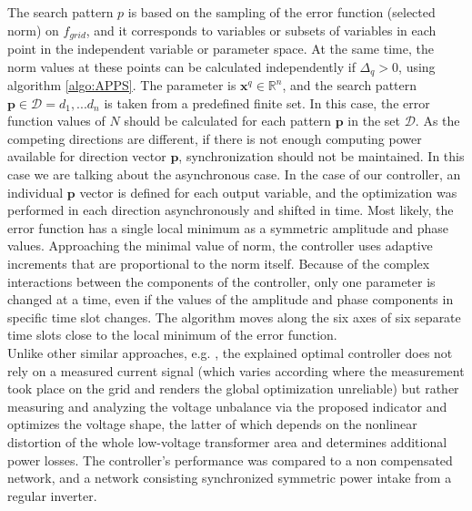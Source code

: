          The search pattern $p$ is based on the sampling of the error function (selected norm) on $f_{grid}$, and it corresponds to variables or subsets of variables in each point in the independent variable or parameter space. At the same time, the norm values at these points can be calculated independently if $\Delta_q>0$, using algorithm \ref{algo:APPS}.	
        The parameter is $\textbf{x}^q\in\mathbb{R}^n$, and the  search pattern $\textbf{p}\in\mathcal{D}={d_1,...d_n}$ is taken from a predefined finite set. In this case, the error function values of $N$ should be calculated for each pattern $\textbf{p}$ in the set $\mathcal{D}$. As the competing directions are different, if there is not enough computing power available for direction vector $\textbf{p}$, synchronization should not be maintained. In this case we are talking about the asynchronous case. In the case of our controller, an individual $\textbf{p}$ vector is defined for each output variable, and the optimization was performed in each direction asynchronously and shifted in time. Most likely, the error function has a single local minimum as a symmetric amplitude and phase values. Approaching the minimal value of norm, the controller uses adaptive increments that are proportional to the norm itself. Because of the complex interactions between the components of the controller, only one parameter is changed at a time, even if the values of the amplitude and phase components in specific time slot changes. The algorithm moves along the six axes of six separate time slots close to the local minimum of the error function.\\
        Unlike other similar approaches, e.g. \cite{segui2007approach}, the explained optimal controller does not rely on a measured current signal (which varies according where the measurement took place on the grid and renders the global optimization unreliable) but rather measuring and analyzing the voltage unbalance via the proposed indicator and optimizes the voltage shape, the latter of which depends on the nonlinear distortion of the whole low-voltage transformer area and determines additional power losses. The controller's performance was compared to a non compensated network, and a network consisting synchronized symmetric power intake from a regular inverter.\\
